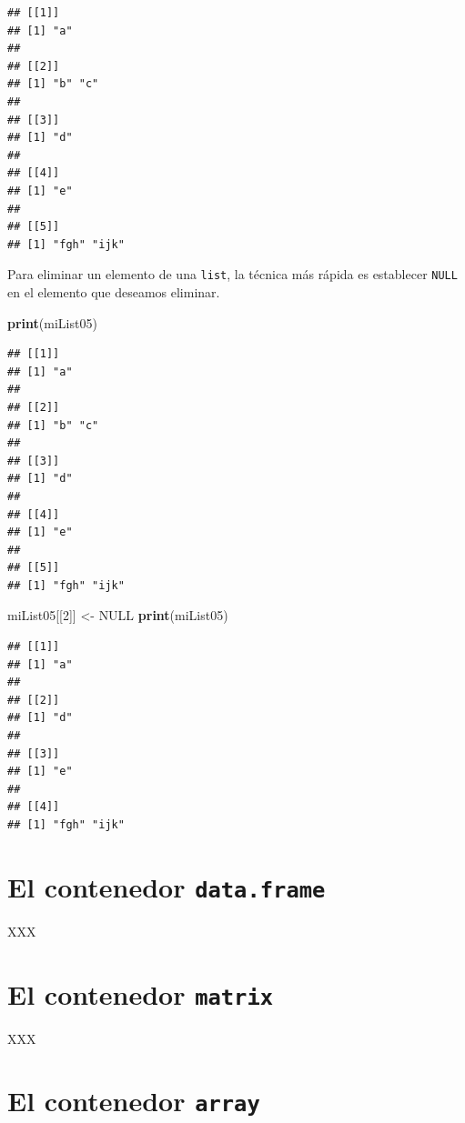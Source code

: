\documentclass[]{book}
\newenvironment{Shaded}{\begin{snugshade}}{\end{snugshade}}
\newcommand{\KeywordTok}[1]{\textcolor[rgb]{0.13,0.29,0.53}{\textbf{#1}}}
\newcommand{\DecValTok}[1]{\textcolor[rgb]{0.00,0.00,0.81}{#1}}
\newcommand{\StringTok}[1]{\textcolor[rgb]{0.31,0.60,0.02}{#1}}
\newcommand{\OtherTok}[1]{\textcolor[rgb]{0.56,0.35,0.01}{#1}}
\newcommand{\NormalTok}[1]{#1}
\begin{document}
\begin{verbatim}
## [[1]]
## [1] "a"
## 
## [[2]]
## [1] "b" "c"
## 
## [[3]]
## [1] "d"
## 
## [[4]]
## [1] "e"
## 
## [[5]]
## [1] "fgh" "ijk"
\end{verbatim}

Para eliminar un elemento de una \texttt{list}, la técnica más rápida es
establecer \texttt{NULL} en el elemento que deseamos eliminar.

\begin{Shaded}
\begin{Highlighting}[]
\KeywordTok{print}\NormalTok{(miList05)}
\end{Highlighting}
\end{Shaded}

\begin{verbatim}
## [[1]]
## [1] "a"
## 
## [[2]]
## [1] "b" "c"
## 
## [[3]]
## [1] "d"
## 
## [[4]]
## [1] "e"
## 
## [[5]]
## [1] "fgh" "ijk"
\end{verbatim}

\begin{Shaded}
\begin{Highlighting}[]
\NormalTok{miList05[[}\DecValTok{2}\NormalTok{]] <-}\StringTok{ }\OtherTok{NULL}
\KeywordTok{print}\NormalTok{(miList05)}
\end{Highlighting}
\end{Shaded}

\begin{verbatim}
## [[1]]
## [1] "a"
## 
## [[2]]
## [1] "d"
## 
## [[3]]
## [1] "e"
## 
## [[4]]
## [1] "fgh" "ijk"
\end{verbatim}

\section{\texorpdfstring{El contenedor
\texttt{data.frame}}{El contenedor data.frame}}\label{el-contenedor-data.frame}

XXX

\section{\texorpdfstring{El contenedor
\texttt{matrix}}{El contenedor matrix}}\label{el-contenedor-matrix}

XXX

\section{\texorpdfstring{El contenedor
\texttt{array}}{El contenedor array}}\label{el-contenedor-array}
\end{document}
